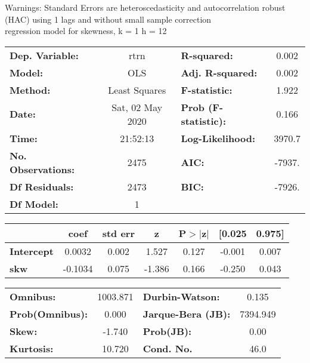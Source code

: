 Warnings: \newline
 [1] Standard Errors are heteroscedasticity and autocorrelation robust (HAC) using 1 lags and without small sample correction\\ 

regression model for skewness, k = 1 h = 12\begin{center}
\begin{tabular}{lclc}
\toprule
\textbf{Dep. Variable:}    &       rtrn       & \textbf{  R-squared:         } &     0.002   \\
\textbf{Model:}            &       OLS        & \textbf{  Adj. R-squared:    } &     0.002   \\
\textbf{Method:}           &  Least Squares   & \textbf{  F-statistic:       } &     1.922   \\
\textbf{Date:}             & Sat, 02 May 2020 & \textbf{  Prob (F-statistic):} &    0.166    \\
\textbf{Time:}             &     21:52:13     & \textbf{  Log-Likelihood:    } &    3970.7   \\
\textbf{No. Observations:} &        2475      & \textbf{  AIC:               } &    -7937.   \\
\textbf{Df Residuals:}     &        2473      & \textbf{  BIC:               } &    -7926.   \\
\textbf{Df Model:}         &           1      & \textbf{                     } &             \\
\bottomrule
\end{tabular}
\begin{tabular}{lcccccc}
                   & \textbf{coef} & \textbf{std err} & \textbf{z} & \textbf{P$> |$z$|$} & \textbf{[0.025} & \textbf{0.975]}  \\
\midrule
\textbf{Intercept} &       0.0032  &        0.002     &     1.527  &         0.127        &       -0.001    &        0.007     \\
\textbf{skw}       &      -0.1034  &        0.075     &    -1.386  &         0.166        &       -0.250    &        0.043     \\
\bottomrule
\end{tabular}
\begin{tabular}{lclc}
\textbf{Omnibus:}       & 1003.871 & \textbf{  Durbin-Watson:     } &    0.135  \\
\textbf{Prob(Omnibus):} &   0.000  & \textbf{  Jarque-Bera (JB):  } & 7394.949  \\
\textbf{Skew:}          &  -1.740  & \textbf{  Prob(JB):          } &     0.00  \\
\textbf{Kurtosis:}      &  10.720  & \textbf{  Cond. No.          } &     46.0  \\
\bottomrule
\end{tabular}
\end{center}

